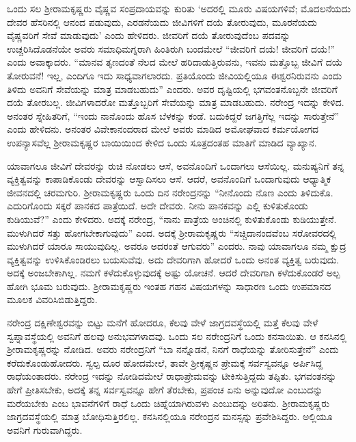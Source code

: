 ಒಂದು ಸಲ ಶ‍್ರೀರಾಮಕೃಷ್ಣರು ವೈಷ್ಣವ ಸಂಪ್ರದಾಯವನ್ನು ಕುರಿತು ‘ಅದರಲ್ಲಿ ಮೂರು ವಿಷಯಗಳಿವೆ; ಮೊದಲನೆಯದು ದೇವರ ಹೆಸರಿನಲ್ಲಿ ಆನಂದ ಪಡುವುದು, ಎರಡನೆಯದು ಜೀವಿಗಳಿಗೆ ದಯೆ ತೋರುವುದು, ಮೂರನೆಯದು ವೈಷ್ಣವರಿಗೆ ಸೇವೆ ಮಾಡುವುದು’ ಎಂದು ಹೇಳಿದರು. ಜೀವರಿಗೆ ದಯೆ ತೋರುವುದೆಂಬ ಪದವನ್ನು ಉಚ್ಚರಿಸಿದೊಡನೆಯೇ ಅವರು ಸಮಾಧಿಮಗ್ನರಾಗಿ ಹಿಂತಿರುಗಿ ಬಂದಮೇಲೆ “ಜೀವರಿಗೆ ದಯೆ! ಜೀವರಿಗೆ ದಯೆ!” ಎಂದು ಅವಾಕ್ಕಾದರು. “ಮಾನವ ತೃಣದಂತೆ ನೆಲದ ಮೇಲೆ ಹರಿದಾಡುತ್ತಿರುವನು, ಇವನು ಮತ್ತೊಬ್ಬ ಜೀವಿಗೆ ದಯೆ ತೋರುವನೆ! ಇಲ್ಲ, ಎಂದಿಗೂ ಇದು ಸಾಧ್ಯವಾಗಲಾರದು. ಪ್ರತಿಯೊಂದು ಜೀವಿಯಲ್ಲಿಯೂ ಈಶ್ವರನಿರುವನು ಎಂದು ತಿಳಿದು ಅವನಿಗೆ ಸೇವೆಯನ್ನು ಮಾತ್ರ ಮಾಡಬಹುದು” ಎಂದರು. ಅವರ ದೃಷ್ಟಿಯಲ್ಲಿ ಭಗವಂತನೊಬ್ಬನೇ ಜೀವರಿಗೆ ದಯೆ ತೋರಬಲ್ಲ. ಜೀವಿಗಳಾದರೋ ಮತ್ತೊಬ್ಬರಿಗೆ ಸೇವೆಯನ್ನು ಮಾತ್ರ ಮಾಡಬಹುದು. ನರೇಂದ್ರ ಇದನ್ನು ಕೇಳಿದ. ಅನಂತರ ಸ್ನೇಹಿತರಿಗೆ, “ಇಂದು ನಾನೊಂದು ಹೊಸ ಬೆಳಕನ್ನು ಕಂಡೆ. ಬದುಕಿದ್ದರೆ ಜಗತ್ತಿಗೆಲ್ಲ ಇದನ್ನು ಸಾರುತ್ತೇನೆ” ಎಂದು ಹೇಳಿದನು. ಅನಂತರ ವಿವೇಕಾನಂದರಾದ ಮೇಲೆ ಅವರು ಮಾಡಿದ ಅಮೋಘವಾದ ಕರ್ಮಯೋಗದ ಉಪನ್ಯಾಸವೆಲ್ಲ ಶ‍್ರೀರಾಮಕೃಷ್ಣರ ಬಾಯಿಯಿಂದ ಕೇಳಿದ ಒಂದು ಸೂತ್ರದಂತಹ ಮಾತಿಗೆ ಮಾಡಿದ ವ್ಯಾಖ್ಯಾನ.

ಯಾವಾಗಲೂ ಜೀವಿಗೆ ದೇವರನ್ನು ರುಚಿ ನೋಡಲು ಆಸೆ, ಅವನೊಂದಿಗೆ ಒಂದಾಗಲು ಆಸೆಯಿಲ್ಲ. ಮನುಷ್ಯನಿಗೆ ತನ್ನ ವ್ಯಕ್ತಿತ್ವವನ್ನು ಕಾಪಾಡಿಕೊಂಡು ದೇವರನ್ನು ಆಸ್ವಾದಿಸಲು ಆಸೆ. ಆದರೆ, ಅವನೊಂದಿಗೆ ಒಂದಾಗುವುದು ಆಧ್ಯಾತ್ಮಿಕ ಜೀವನದಲ್ಲಿ ಚರಮಗುರಿ. ಶ‍್ರೀರಾಮಕೃಷ್ಣರು ಒಂದು ದಿನ ನರೇಂದ್ರನನ್ನು “ನೀನೊಂದು ನೊಣ ಎಂದು ತಿಳಿದುಕೊ. ಎದುರಿಗೊಂದು ಸಕ್ಕರೆ ಪಾನಕದ ಪಾತ್ರೆಯಿದೆ. ಅದೇ ದೇವರು. ನೀನು ಪಾನಕವನ್ನು ಎಲ್ಲಿ ಕುಳಿತುಕೊಂಡು ಕುಡಿಯುವೆ?” ಎಂದು ಕೇಳಿದರು. ಅದಕ್ಕೆ ನರೇಂದ್ರ, “ನಾನು ಪಾತ್ರೆಯ ಅಂಚಿನಲ್ಲಿ ಕುಳಿತುಕೊಂಡು ಕುಡಿಯುತ್ತೇನೆ. ಮುಳುಗಿದರೆ ಸತ್ತು ಹೋಗಬೇಕಾಗುವುದು” ಎಂದ. ಅದಕ್ಕೆ ಶ‍್ರೀರಾಮಕೃಷ್ಣರು “ಸಚ್ಚಿದಾನಂದವೆಂಬ ಸರೋವರದಲ್ಲಿ ಮುಳುಗಿದರೆ ಯಾರೂ ಸಾಯುವುದಿಲ್ಲ. ಅವರೂ ಅದರಂತೆ ಆಗುವರು” ಎಂದರು. ನಾವು ಯಾವಾಗಲೂ ನಮ್ಮ ಕ್ಷುದ್ರ ವ್ಯಕ್ತಿತ್ವವನ್ನು ಉಳಿಸಿಕೊಂಡಿರಲು ಬಯಸುವೆವು. ಅದು ದೇವರಿಗಾಗಿ ಹೋದರೆ ಒಂದು ಅನಂತ ವ್ಯಕ್ತಿತ್ವ ಬರುವುದು. ಅದಕ್ಕೆ ಅಂಜಬೇಕಾಗಿಲ್ಲ. ನಮಗೆ ಕಳೆದುಕೊಳ್ಳುವುದಕ್ಕೆ ಅಷ್ಟು ಯೋಚನೆ. ಆದರೆ ದೇವರಿಗಾಗಿ ಕಳೆದುಕೊಂಡರೆ ಅಲ್ಪ ಹೋಗಿ ಭೂಮ ಬರುವುದು. ಶ‍್ರೀರಾಮಕೃಷ್ಣರು ಇಂತಹ ಗಹನ ವಿಷಯಗಳನ್ನು ಸಾಧಾರಣ ಒಂದು ಉಪಮಾನದ ಮೂಲಕ ವಿವರಿಸಿಬಿಡುತ್ತಿದ್ದರು.

ನರೇಂದ್ರ ದಕ್ಷಿಣೇಶ್ವರವನ್ನು ಬಿಟ್ಟು ಮನೆಗೆ ಹೋದರೂ, ಕೆಲವು ವೇಳೆ ಜಾಗ್ರದವಸ್ಥೆಯಲ್ಲಿ ಮತ್ತೆ ಕೆಲವು ವೇಳೆ ಸ್ವಪ್ನಾವಸ್ಥೆಯಲ್ಲಿ ಅವನಿಗೆ ಹಲವು ಅನುಭವಗಳಾದವು. ಒಂದು ಸಲ ನರೇಂದ್ರನಿಗೆ ಒಂದು ಕನಸಾಯಿತು. ಆ ಕನಸಿನಲ್ಲಿ ಶ‍್ರೀರಾಮಕೃಷ್ಣರನ್ನು ನೋಡಿದ. ಅವರು ನರೇಂದ್ರನಿಗೆ “ಬಾ ನನ್ನೊಡನೆ, ನಿನಗೆ ರಾಧೆಯನ್ನು ತೋರಿಸುತ್ತೇನೆ” ಎಂದು ಕರೆದುಕೊಂಡುಹೋದರು. ಸ್ವಲ್ಪ ದೂರ ಹೋದಮೇಲೆ, ತಾವೇ ಶ‍್ರೀಕೃಷ್ಣನ ಪ್ರೇಮಕ್ಕೆ ಸರ್ವಸ್ವವನ್ನೂ ಅರ್ಪಿಸಿದ್ದ ರಾಧೆಯಂತಾದರು. ನರೇಂದ್ರ ಇದನ್ನು ನೋಡಿದಮೇಲೆ ರಾಧಾಪ್ರೇಮವನ್ನು ಟೀಕಿಸುತ್ತಿದ್ದದು ತಪ್ಪಿತು. ಭಗವಂತನನ್ನು ಹೇಗೆ ಪ್ರೀತಿಸಬೇಕು, ಅದಕ್ಕೆ ತನ್ನ ಸರ್ವಸ್ವವನ್ನೂ ಹೇಗೆ ತೆರಬೇಕು, ಪ್ರಪಂಚ ಏನು ಅನ್ನುವುದೋ ಎಂಬುದನ್ನು ಮರೆಯಬೇಕು ಎಂಬ ಭಾವನೆಗಳಿಗೆ ರಾಧೆ ಒಂದು ಚಿಹ್ನೆಯಾಗಿರುವಳು ಎಂಬುದನ್ನು ಅರಿತನು. ಶ‍್ರೀರಾಮಕೃಷ್ಣರು ಜಾಗ್ರದವಸ್ಥೆಯಲ್ಲಿ ಮಾತ್ರ ಬೋಧಿಸುತ್ತಿರಲಿಲ್ಲ. ಕನಸಿನಲ್ಲಿಯೂ ನರೇಂದ್ರನ ಮನಸ್ಸನ್ನು ಪ್ರವೇಶಿಸಿದ್ದರು. ಅಲ್ಲಿಯೂ ಅವನಿಗೆ ಗುರುವಾಗಿದ್ದರು.

